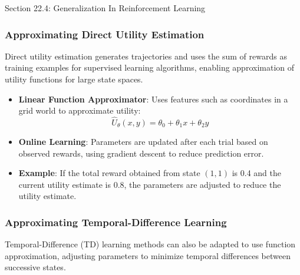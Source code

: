 \begin{notes}{Section 22.4: Generalization In Reinforcement Learning}
\begin{highlight}
    \end{highlight}
    
    \subsubsection*{Approximating Direct Utility Estimation}
    
    Direct utility estimation generates trajectories and uses the sum of rewards as training examples for supervised learning algorithms, enabling approximation of utility functions for large state spaces.
    
    \begin{highlight}
    
        \begin{itemize}
            \item \textbf{Linear Function Approximator}: Uses features such as coordinates in a grid world to approximate utility:
            \[
            \hat{U}_\theta(x, y) = \theta_0 + \theta_1 x + \theta_2 y
            \]
            \item \textbf{Online Learning}: Parameters are updated after each trial based on observed rewards, using gradient descent to reduce prediction error.
            \item \textbf{Example}: If the total reward obtained from state $(1,1)$ is 0.4 and the current utility estimate is 0.8, the parameters are adjusted to reduce the utility estimate.
        \end{itemize}
    
    \end{highlight}
    
    \subsubsection*{Approximating Temporal-Difference Learning}
    
    Temporal-Difference (TD) learning methods can also be adapted to use function approximation, adjusting parameters to minimize temporal differences between successive states.
    
    \begin{highlight}
    

\end{highlight}
\end{notes}
